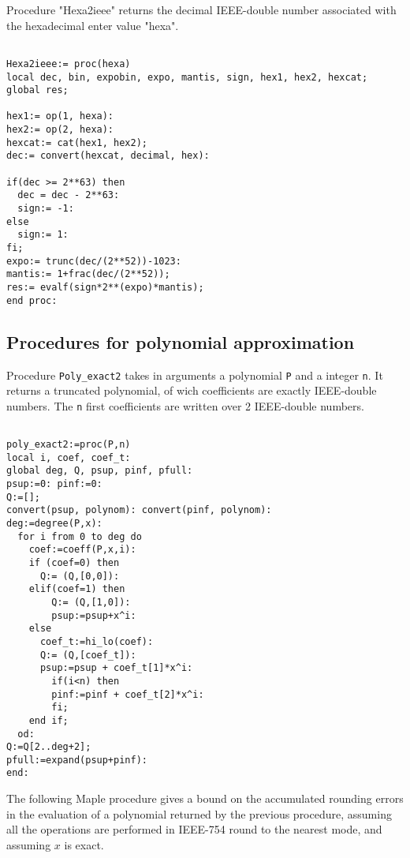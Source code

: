 Procedure "Hexa2ieee" returns the decimal IEEE-double number associated with the hexadecimal enter value "hexa".

\begin{lstlisting}[caption={Hexa2ieee},firstnumber=1]

Hexa2ieee:= proc(hexa)
local dec, bin, expobin, expo, mantis, sign, hex1, hex2, hexcat;
global res;

hex1:= op(1, hexa):
hex2:= op(2, hexa):
hexcat:= cat(hex1, hex2);
dec:= convert(hexcat, decimal, hex):

if(dec >= 2**63) then
  dec = dec - 2**63:
  sign:= -1:
else
  sign:= 1:
fi;  
expo:= trunc(dec/(2**52))-1023:
mantis:= 1+frac(dec/(2**52));
res:= evalf(sign*2**(expo)*mantis);
end proc:
\end{lstlisting}


\subsection{Procedures for polynomial approximation}


Procedure \texttt{Poly\_exact2} takes in arguments a polynomial \texttt{P} and a
integer \texttt{n}. It returns a truncated polynomial, of wich coefficients
are exactly IEEE-double numbers. The \texttt{n} first coefficients are written
over 2 IEEE-double numbers.
 

\begin{lstlisting}[caption={poly\_exact2},firstnumber=1]

poly_exact2:=proc(P,n)
local i, coef, coef_t:
global deg, Q, psup, pinf, pfull:
psup:=0: pinf:=0:
Q:=[];
convert(psup, polynom): convert(pinf, polynom):
deg:=degree(P,x):
  for i from 0 to deg do
    coef:=coeff(P,x,i):
    if (coef=0) then
      Q:= (Q,[0,0]):
    elif(coef=1) then
        Q:= (Q,[1,0]):
        psup:=psup+x^i:
    else        
      coef_t:=hi_lo(coef):
      Q:= (Q,[coef_t]):
      psup:=psup + coef_t[1]*x^i:
        if(i<n) then
        pinf:=pinf + coef_t[2]*x^i:
        fi;
    end if;
  od:
Q:=Q[2..deg+2];
pfull:=expand(psup+pinf):
end:
\end{lstlisting}
\vspace{0.5cm}



The following Maple procedure gives a bound on the accumulated
rounding errors in the evaluation of a polynomial returned by the
previous procedure, assuming all the operations are performed in
IEEE-754 round to the nearest mode, and assuming $x$ is exact.

